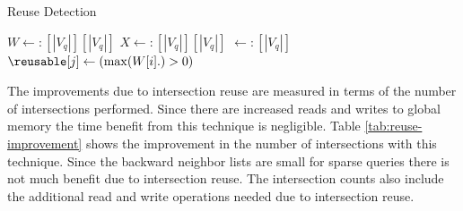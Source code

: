 {\begin{algorithm}
    \caption{Reuse Detection}
    \label{algo:reuse}
    $W \leftarrow: [|V_q|][|V_q|]$\;
    $X \leftarrow: [|V_q|][|V_q|]$\;
    \reusable $\leftarrow: [|V_q|]$\;
    $\reusable[j] \leftarrow (\max({W[i].)} > 0)$\;
\end{algorithm}

The improvements due to intersection reuse are measured in terms of the number of intersections performed.
Since there are increased reads and writes to global memory the time benefit from this technique is negligible. Table \ref{tab:reuse-improvement} shows the improvement in the number of intersections with this technique.
Since the backward neighbor lists are small for sparse queries there is not much benefit due to intersection reuse.
The intersection counts also include the additional read and write operations needed due to intersection reuse.

}
